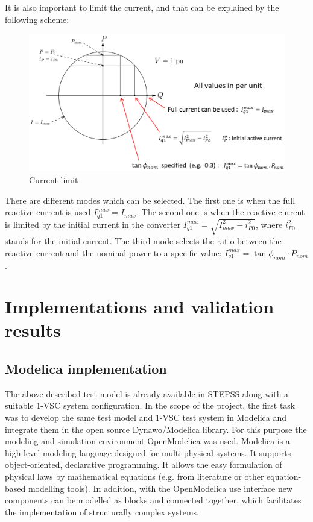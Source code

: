 \documentclass{report}
\begin{document}
It is also important to limit the current, and that can be explained by the following scheme:
\begin{figure}[H]
    \centering
    \includegraphics[scale = 0.4]{Figure_converter/current_limit.png}
    \caption{Current limit}
    \label{fig:current_limit}
\end{figure}
There are different modes which can be selected. The first one is when the full reactive current is used $I_{q1}^{max} = I_{max}$. The second one is when the reactive current is limited by the initial current in the converter $I_{q1}^{max} = \sqrt{I_{max}^2 - i_{P0}^2}$, where $i_{P0}^2$ stands for the initial current. The third mode selects the ratio between the reactive current and the nominal power to a specific value: $I_{q1}^{max} = \tan\phi_{nom}\cdot P_{nom}$.

\section{Implementations and validation results}
\subsection{Modelica implementation}
The above described test model is already available in STEPSS along with a suitable 1-VSC system configuration. In the scope of the project, the first task was to develop the same test model and 1-VSC test system in Modelica and integrate them in the open source Dynawo/Modelica library. For this purpose the modeling and simulation environment OpenModelica was used.
Modelica is a high-level modeling language designed for multi-physical systems. It supports object-oriented, declarative programming. It allows the easy formulation of physical laws by mathematical equations (e.g. from literature or other equation-based modelling tools). In addition, with the OpenModelica use interface new components can be modelled as blocks and connected together, which facilitates the implementation of structurally complex systems.
\end{document}
